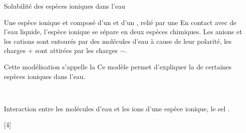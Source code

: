 \begin{doc}{Solubilité des espèces ioniques dans l'eau}
  
  Une espèce ionique et composé d'un  et d'un , relié par une 
  En contact avec de l'eau liquide, l'espèce ionique se sépare en deux espèces chimiques.
  Les anions et les cations sont entourés par des molécules d'eau à cause de leur polarité, les charges $+$ sont attirées par les charges $-$.
  
  Cette modélisation s'appelle la 
  Ce modèle permet d'expliquer la  de certaines espèces ioniques dans l'eau.

  \begin{center}
    ~

    \vspace*{-12pt}
    Interaction entre les molécules d'eau et les ions d'une espèce ionique, le sel .
  \end{center}
\end{doc}

[4]

